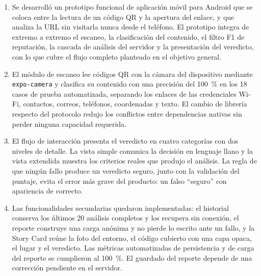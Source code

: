 \begin{enumerate}
	\item Se desarrolló un prototipo funcional de aplicación móvil para Android que se coloca entre la lectura de un código QR y la apertura del enlace, y que analiza la URL sin visitarla nunca desde el teléfono. El prototipo integra de extremo a extremo el escaneo, la clasificación del contenido, el filtro F1 de reputación, la cascada de análisis del servidor y la presentación del veredicto, con lo que cubre el flujo completo planteado en el objetivo general.

	\item El módulo de escaneo lee códigos QR con la cámara del dispositivo mediante \texttt{expo-camera} y clasifica su contenido con una precisión del 100~\% en los 18 casos de prueba automatizada, separando los enlaces de las credenciales Wi-Fi, contactos, correos, teléfonos, coordenadas y texto. El cambio de librería respecto del protocolo redujo los conflictos entre dependencias nativas sin perder ninguna capacidad requerida.

	\item El flujo de interacción presenta el veredicto en cuatro categorías con dos niveles de detalle. La vista simple comunica la decisión en lenguaje llano y la vista extendida muestra los criterios reales que produjo el análisis. La regla de que ningún fallo produce un veredicto seguro, junto con la validación del puntaje, evita el error más grave del producto: un falso ``seguro'' con apariencia de correcto.

	\item Las funcionalidades secundarias quedaron implementadas: el historial conserva los últimos 20 análisis completos y los recupera sin conexión, el reporte construye una carga anónima y no pierde lo escrito ante un fallo, y la Story Card reúne la foto del entorno, el código cubierto con una capa opaca, el lugar y el veredicto. Las métricas automatizadas de persistencia y de carga del reporte se cumplieron al 100~\%. El guardado del reporte depende de una corrección pendiente en el servidor.


\end{enumerate}
